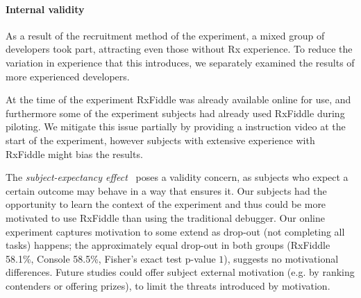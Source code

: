 \paragraph{Internal validity}
As a result of the recruitment method of the experiment, a mixed group of developers took part, attracting even those without Rx experience. To reduce the variation in experience that this introduces, we separately examined the results of more experienced developers.

At the time of the experiment RxFiddle was already available online for use, and furthermore some of the experiment subjects had already used RxFiddle during piloting. We mitigate this issue partially by providing a instruction video at the start of the experiment, however subjects with extensive experience with RxFiddle might bias the results.

The \emph{subject-expectancy effect}~\cite{ko2015practical} poses a validity concern, as subjects who expect a certain outcome may behave in a way that ensures it. Our subjects had the opportunity to learn the context of the experiment and thus could be more motivated to use RxFiddle than using the traditional debugger. Our online experiment captures motivation to some extend as drop-out (not completing all tasks) happens; the approximately equal drop-out in both groups (RxFiddle 58.1\%, Console 58.5\%, Fisher's exact test p-value $1$), suggests no motivational differences. Future studies could offer subject external motivation (e.g. by ranking contenders or offering prizes), to limit the threats introduced by motivation.



